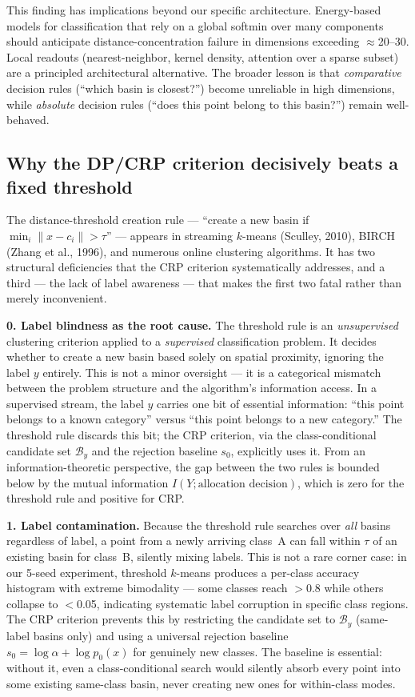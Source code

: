 \documentclass[11pt,a4paper]{article}
\begin{document}
This finding has implications beyond our specific architecture. Energy-based models for classification that rely on a global softmin over many components should anticipate distance-concentration failure in dimensions exceeding $\approx$20--30. Local readouts (nearest-neighbor, kernel density, attention over a sparse subset) are a principled architectural alternative. The broader lesson is that \textit{comparative} decision rules (``which basin is closest?'') become unreliable in high dimensions, while \textit{absolute} decision rules (``does this point belong to this basin?'') remain well-behaved.

\subsection{Why the DP/CRP criterion decisively beats a fixed threshold}

The distance-threshold creation rule --- ``create a new basin if $\min_i\|x-c_i\| > \tau$'' --- appears in streaming $k$-means (Sculley, 2010), BIRCH (Zhang et al., 1996), and numerous online clustering algorithms. It has two structural deficiencies that the CRP criterion systematically addresses, and a third --- the lack of label awareness --- that makes the first two fatal rather than merely inconvenient.

\textbf{0. Label blindness as the root cause.} The threshold rule is an \textit{unsupervised} clustering criterion applied to a \textit{supervised} classification problem. It decides whether to create a new basin based solely on spatial proximity, ignoring the label $y$ entirely. This is not a minor oversight --- it is a categorical mismatch between the problem structure and the algorithm's information access. In a supervised stream, the label $y$ carries one bit of essential information: ``this point belongs to a known category'' versus ``this point belongs to a new category.'' The threshold rule discards this bit; the CRP criterion, via the class-conditional candidate set $\mathcal{B}_y$ and the rejection baseline $s_0$, explicitly uses it. From an information-theoretic perspective, the gap between the two rules is bounded below by the mutual information $I(Y; \text{allocation decision})$, which is zero for the threshold rule and positive for CRP.

\textbf{1. Label contamination.} Because the threshold rule searches over \textit{all} basins regardless of label, a point from a newly arriving class~A can fall within $\tau$ of an existing basin for class~B, silently mixing labels. This is not a rare corner case: in our 5-seed experiment, threshold $k$-means produces a per-class accuracy histogram with extreme bimodality --- some classes reach $>$0.8 while others collapse to $<$0.05, indicating systematic label corruption in specific class regions. The CRP criterion prevents this by restricting the candidate set to $\mathcal{B}_y$ (same-label basins only) and using a universal rejection baseline $s_0 = \log\alpha + \log p_0(x)$ for genuinely new classes. The baseline is essential: without it, even a class-conditional search would silently absorb every point into some existing same-class basin, never creating new ones for within-class modes.
\end{document}

